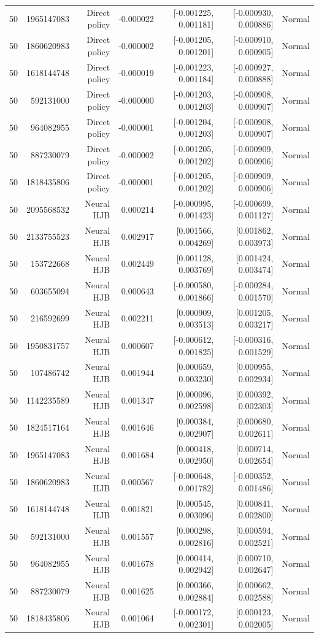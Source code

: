 \begin{longtable}{lrrrrrr}
50 & 1965147083 & Direct policy & -0.000022 & [-0.001225, 0.001181] & [-0.000930, 0.000886] & Normal \\
50 & 1860620983 & Direct policy & -0.000002 & [-0.001205, 0.001201] & [-0.000910, 0.000905] & Normal \\
50 & 1618144748 & Direct policy & -0.000019 & [-0.001223, 0.001184] & [-0.000927, 0.000888] & Normal \\
50 & 592131000 & Direct policy & -0.000000 & [-0.001203, 0.001203] & [-0.000908, 0.000907] & Normal \\
50 & 964082955 & Direct policy & -0.000001 & [-0.001204, 0.001203] & [-0.000908, 0.000907] & Normal \\
50 & 887230079 & Direct policy & -0.000002 & [-0.001205, 0.001202] & [-0.000909, 0.000906] & Normal \\
50 & 1818435806 & Direct policy & -0.000001 & [-0.001205, 0.001202] & [-0.000909, 0.000906] & Normal \\
50 & 2095568532 & Neural HJB & 0.000214 & [-0.000995, 0.001423] & [-0.000699, 0.001127] & Normal \\
50 & 2133755523 & Neural HJB & 0.002917 & [0.001566, 0.004269] & [0.001862, 0.003973] & Normal \\
50 & 153722668 & Neural HJB & 0.002449 & [0.001128, 0.003769] & [0.001424, 0.003474] & Normal \\
50 & 603655094 & Neural HJB & 0.000643 & [-0.000580, 0.001866] & [-0.000284, 0.001570] & Normal \\
50 & 216592699 & Neural HJB & 0.002211 & [0.000909, 0.003513] & [0.001205, 0.003217] & Normal \\
50 & 1950831757 & Neural HJB & 0.000607 & [-0.000612, 0.001825] & [-0.000316, 0.001529] & Normal \\
50 & 107486742 & Neural HJB & 0.001944 & [0.000659, 0.003230] & [0.000955, 0.002934] & Normal \\
50 & 1142235589 & Neural HJB & 0.001347 & [0.000096, 0.002598] & [0.000392, 0.002303] & Normal \\
50 & 1824517164 & Neural HJB & 0.001646 & [0.000384, 0.002907] & [0.000680, 0.002611] & Normal \\
50 & 1965147083 & Neural HJB & 0.001684 & [0.000418, 0.002950] & [0.000714, 0.002654] & Normal \\
50 & 1860620983 & Neural HJB & 0.000567 & [-0.000648, 0.001782] & [-0.000352, 0.001486] & Normal \\
50 & 1618144748 & Neural HJB & 0.001821 & [0.000545, 0.003096] & [0.000841, 0.002800] & Normal \\
50 & 592131000 & Neural HJB & 0.001557 & [0.000298, 0.002816] & [0.000594, 0.002521] & Normal \\
50 & 964082955 & Neural HJB & 0.001678 & [0.000414, 0.002942] & [0.000710, 0.002647] & Normal \\
50 & 887230079 & Neural HJB & 0.001625 & [0.000366, 0.002884] & [0.000662, 0.002588] & Normal \\
50 & 1818435806 & Neural HJB & 0.001064 & [-0.000172, 0.002301] & [0.000123, 0.002005] & Normal \\
\bottomrule
\end{longtable}
